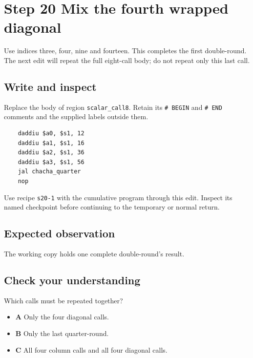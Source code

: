 \section{Step 20 Mix the fourth wrapped diagonal}\label{chacha-s20}

Use indices three, four, nine and fourteen. This completes the first double-round. The next edit will repeat the full eight-call body; do not repeat only this last call.

\subsection{Write and inspect}
Replace the body of region \texttt{scalar\_call8}. Retain its \texttt{\# BEGIN} and \texttt{\# END} comments and the supplied labels outside them.

\begin{verbatim}
    daddiu $a0, $s1, 12
    daddiu $a1, $s1, 16
    daddiu $a2, $s1, 36
    daddiu $a3, $s1, 56
    jal chacha_quarter
    nop
\end{verbatim}

Use recipe \texttt{s20-1} with the cumulative program through this edit. Inspect its named checkpoint before continuing to the temporary or normal return.

\subsection{Expected observation}
The working copy holds one complete double-round's result.

\subsection{Check your understanding}
Which calls must be repeated together?

\begin{itemize}
\item \textbf{A} Only the four diagonal calls.
\item \textbf{B} Only the last quarter-round.
\item \textbf{C} All four column calls and all four diagonal calls.
\end{itemize}

